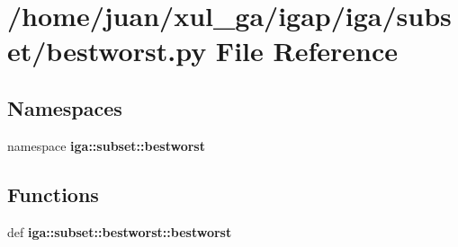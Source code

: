 \section{/home/juan/xul\_\-ga/igap/iga/subset/bestworst.py File Reference}
\label{bestworst_8py}
\subsection*{Namespaces}
\begin{CompactItemize}
\item 
namespace {\bf iga::subset::bestworst}
\end{CompactItemize}
\subsection*{Functions}
\begin{CompactItemize}
\item 
def {\bf iga::subset::bestworst::bestworst}
\end{CompactItemize}
